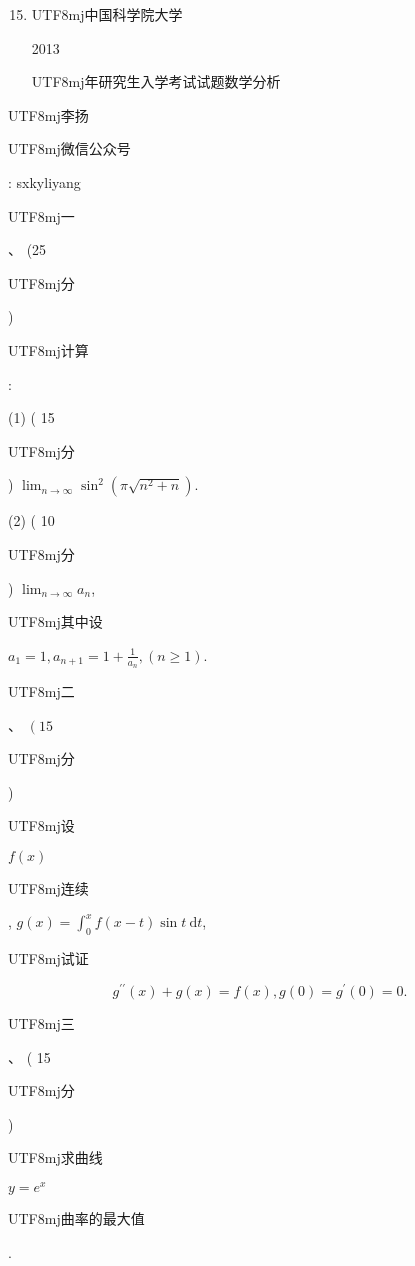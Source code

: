 \documentclass[10pt]{article}
\begin{document}
\begin{enumerate}
  \setcounter{enumi}{14}
  \item \begin{CJK}{UTF8}{mj}中国科学院大学\end{CJK} 2013 \begin{CJK}{UTF8}{mj}年研究生入学考试试题数学分析\end{CJK}
\end{enumerate}
\begin{CJK}{UTF8}{mj}李扬\end{CJK}

\begin{CJK}{UTF8}{mj}微信公众号\end{CJK}: sxkyliyang

\begin{CJK}{UTF8}{mj}一\end{CJK}、 (25 \begin{CJK}{UTF8}{mj}分\end{CJK}) \begin{CJK}{UTF8}{mj}计算\end{CJK}:

(1) ( 15 \begin{CJK}{UTF8}{mj}分\end{CJK}) $\lim _{n \rightarrow \infty} \sin ^{2}\left(\pi \sqrt{n^{2}+n}\right)$.

(2) ( 10 \begin{CJK}{UTF8}{mj}分\end{CJK}) $\lim _{n \rightarrow \infty} a_{n}$, \begin{CJK}{UTF8}{mj}其中设\end{CJK} $a_{1}=1, a_{n+1}=1+\frac{1}{a_{n}},(n \geq 1)$.

\begin{CJK}{UTF8}{mj}二\end{CJK}、 $\left(15\right.$ \begin{CJK}{UTF8}{mj}分\end{CJK}) \begin{CJK}{UTF8}{mj}设\end{CJK} $f(x)$ \begin{CJK}{UTF8}{mj}连续\end{CJK}, $g(x)=\int_{0}^{x} f(x-t) \sin t \mathrm{~d} t$, \begin{CJK}{UTF8}{mj}试证\end{CJK}
$$
g^{\prime \prime}(x)+g(x)=f(x), g(0)=g^{\prime}(0)=0 .
$$
\begin{CJK}{UTF8}{mj}三\end{CJK}、 ( 15 \begin{CJK}{UTF8}{mj}分\end{CJK}) \begin{CJK}{UTF8}{mj}求曲线\end{CJK} $y=e^{x}$ \begin{CJK}{UTF8}{mj}曲率的最大值\end{CJK}.
\end{document}
